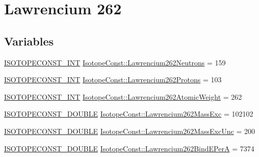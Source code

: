 \hypertarget{group___isotope_const-_lawrencium-_lr262}{}\section{Lawrencium 262}
\label{group___isotope_const-_lawrencium-_lr262}
\subsection*{Variables}
\begin{DoxyCompactItemize}
\item 
\mbox{\hyperlink{group___isotope_const-_macros_ga5f18360b3e99483a35c32d789e62621c}{I\+S\+O\+T\+O\+P\+E\+C\+O\+N\+S\+T\+\_\+\+I\+NT}} \mbox{\hyperlink{group___isotope_const-_lawrencium-_lr262_gac1ff17660d04832b3bd7d12295190dbb}{Isotope\+Const\+::\+Lawrencium262\+Neutrons}} = 159
\item 
\mbox{\hyperlink{group___isotope_const-_macros_ga5f18360b3e99483a35c32d789e62621c}{I\+S\+O\+T\+O\+P\+E\+C\+O\+N\+S\+T\+\_\+\+I\+NT}} \mbox{\hyperlink{group___isotope_const-_lawrencium-_lr262_ga8636e93a9275ec2313f1aac2b53e31ce}{Isotope\+Const\+::\+Lawrencium262\+Protons}} = 103
\item 
\mbox{\hyperlink{group___isotope_const-_macros_ga5f18360b3e99483a35c32d789e62621c}{I\+S\+O\+T\+O\+P\+E\+C\+O\+N\+S\+T\+\_\+\+I\+NT}} \mbox{\hyperlink{group___isotope_const-_lawrencium-_lr262_ga6f05f4534c323b35639ba508b3d8ad8f}{Isotope\+Const\+::\+Lawrencium262\+Atomic\+Weight}} = 262
\item 
\mbox{\hyperlink{group___isotope_const-_macros_ga8f45a7272ce02c0b4c65c44636ed719a}{I\+S\+O\+T\+O\+P\+E\+C\+O\+N\+S\+T\+\_\+\+D\+O\+U\+B\+LE}} \mbox{\hyperlink{group___isotope_const-_lawrencium-_lr262_gaa312f75b707553648c7e2498d5f17a1f}{Isotope\+Const\+::\+Lawrencium262\+Mass\+Exc}} = 102102
\item 
\mbox{\hyperlink{group___isotope_const-_macros_ga8f45a7272ce02c0b4c65c44636ed719a}{I\+S\+O\+T\+O\+P\+E\+C\+O\+N\+S\+T\+\_\+\+D\+O\+U\+B\+LE}} \mbox{\hyperlink{group___isotope_const-_lawrencium-_lr262_ga84898ad956d79c747cc109964a00564a}{Isotope\+Const\+::\+Lawrencium262\+Mass\+Exc\+Unc}} = 200
\item 
\mbox{\hyperlink{group___isotope_const-_macros_ga8f45a7272ce02c0b4c65c44636ed719a}{I\+S\+O\+T\+O\+P\+E\+C\+O\+N\+S\+T\+\_\+\+D\+O\+U\+B\+LE}} \mbox{\hyperlink{group___isotope_const-_lawrencium-_lr262_gaca23ea92c5d7492b4ea29c26c5afd4f2}{Isotope\+Const\+::\+Lawrencium262\+Bind\+E\+PerA}} = 7374
\item 

\end{DoxyCompactItemize}
